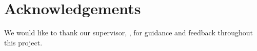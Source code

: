 \section*{Acknowledgements}
We would like to thank our supervisor, \textbf{\supervisor}, for guidance and feedback throughout this project.

